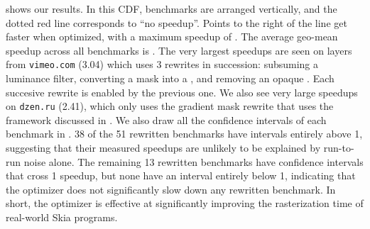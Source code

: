 \documentclass[main.tex]{subfiles}
\begin{document}
 shows our results.
In this CDF, benchmarks are arranged vertically,
  and the dotted red line corresponds to ``no speedup''.
Points to the right of the line get faster when optimized,
  with a maximum speedup of \graphiteAppleMaxSpeedup.
The average geo-mean speedup
  across all \graphiteAppleNumBench benchmarks
  is \graphiteAppleGeoSpeedup.
The very largest speedups are seen
  on layers from \texttt{vimeo.com} (3.04\texttimes) which uses 3 rewrites in succession:
  subsuming a luminance filter,
  converting a \DstIn mask into a \Clip,
  and removing an opaque \SaveLayer.
Each succesive rewrite is enabled by the previous one.
We also see very large speedups on \texttt{dzen.ru} (2.41\texttimes),
  which only uses the gradient mask rewrite
  that uses the framework discussed in .
We also draw all the confidence intervals of each benchmark in .
38 of the 51 rewritten benchmarks have intervals entirely above 1\texttimes,
  suggesting that their measured speedups are unlikely to be explained by run-to-run noise alone.
The remaining 13 rewritten benchmarks have confidence intervals that cross 1\texttimes{} speedup,
  but none have an interval entirely below 1\texttimes, indicating that the optimizer
  does not significantly slow down any rewritten benchmark.
In short, the optimizer is effective
  at significantly improving the rasterization time
  of real-world Skia programs.
\end{document}
